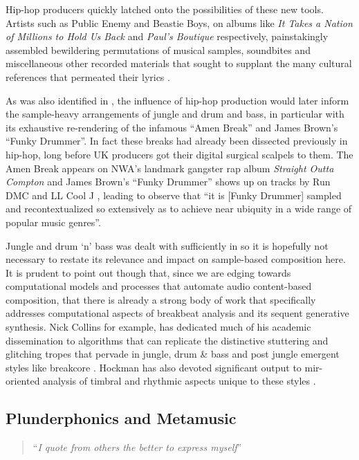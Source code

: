 Hip-hop producers quickly latched onto the possibilities of these new tools. Artists such as Public Enemy and Beastie Boys, on albums like \textit{It Takes a Nation of Millions to Hold Us Back} and \textit{Paul's Boutique} respectively, painstakingly assembled bewildering permutations of musical samples, soundbites and miscellaneous other recorded materials that sought to supplant the many cultural references that permeated their lyrics \citep{Sewell2013, Sewell2014}. 

As was also identified in , the influence of hip-hop production would later inform the sample-heavy arrangements of jungle and drum and bass, in particular with its exhaustive re-rendering of the infamous ``Amen Break'' and James Brown's ``Funky Drummer''. In fact these breaks had already been dissected previously in hip-hop, long before UK producers got their digital surgical scalpels to them. The Amen Break appears on NWA's landmark gangster rap album \textit{Straight Outta Compton} and James Brown's ``Funky Drummer'' shows up on tracks by Run DMC and LL Cool J \citep{Frane2017}, leading \cite{Oliver2015} to observe that ``it is [Funky Drummer] sampled and recontextualized so extensively as to achieve near ubiquity in a wide range of popular music genres''.

Jungle and drum `n' bass was dealt with sufficiently in  so it is hopefully not necessary to restate its relevance and impact on sample-based composition here. It is prudent to point out though that, since we are edging towards computational models and processes that automate audio content-based composition, that there is already a strong body of work that specifically addresses computational aspects of breakbeat analysis and its sequent generative synthesis. Nick Collins for example, has dedicated much of his academic dissemination to algorithms that can replicate the distinctive stuttering and glitching tropes that pervade in jungle, drum \& bass and post jungle emergent styles like breakcore \citep{Collins2001, Collins2002, Collins2006a}. Hockman has also devoted significant output to \acrshort{mir}-oriented analysis of timbral and rhythmic aspects unique to these styles \citep{Hockman2007, Hockman2012, Hockman2015}.

\subsection{Plunderphonics and Metamusic}

\blockquote{``\textit{I quote from others the better to express myself}''}

